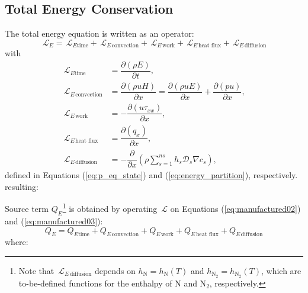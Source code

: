 \documentclass[10pt]{article}
\newcommand{\Diff}[2] {\dfrac{\partial( #1)}{\partial #2}}
\newcommand{\diff}[2] {\dfrac{\partial #1 }{\partial #2}}
\newcommand{\Lo}{\,\mathcal{L}}
\newcommand{\N}{\text{N}}
\newcommand{\convection}{\,\text{convection}}
\newcommand{\diffusion}{\,\text{diffusion}}
\newcommand{\work}{\,\text{work}}
\newcommand{\heatflux}{\,\text{heat flux}}
\begin{document}
\subsection{Total Energy Conservation}
The total energy equation is written as an operator:
\begin{equation*}
 \label{eq:ns1d_14}
\Lo_E = \Lo_{E \text{time}} + \Lo_{E \convection} + \Lo_{E \work} + \Lo_{E \heatflux} + \Lo_{E \diffusion}
\end{equation*}
with
\begin{equation}
\begin{split}
\Lo_{E \text{time}}&= \Diff{\rho E}{t} ,\\
\Lo_{E \convection} &= \Diff{\rho u H}{x} = \Diff{\rho uE}{x}+\Diff{pu}{x},\\
\Lo_{E \work} &= -\Diff{u\tau_{xx}}{x},\\
\Lo_{E \heatflux} &=\Diff{q_x}{x},\\ 
 \Lo_{E \diffusion}&= -\diff{ }{x}\left(\rho \sum_{s=1}^{ns} h_s \mathcal{D}_s \nabla c_s\right),	
\end{split}
\end{equation}
defined in Equations (\ref{eq:p_eq_state}) and (\ref{eq:energy_partition}), respectively.  resulting:

Source term $Q_E$\footnote{Note that $\Lo_{E \diffusion}$ depends on $h_\N=h_\N(T)$ and $h_{\N_2}=h_{\N_2}(T)$, which are 
to-be-defined functions for the enthalpy of N and N$_2$, respectively.} is obtained by operating $\Lo$ on Equations
(\ref{eq:manufactured02}) and (\ref{eq:manufactured03}):
$$Q_E = Q_{E \text{time}} + Q_{E \convection} + Q_{E \work} + Q_{E \heatflux} + Q_{E \diffusion	}$$
where:
\end{document}
